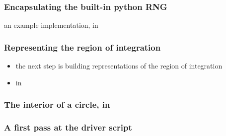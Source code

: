 %
%


\begin{frame}[fragile]
%
  \frametitle{Encapsulating the built-in python RNG}
%
  an example implementation, in 
%
%
\end{frame}

\begin{frame}[fragile]
%
  \frametitle{Representing the region of integration}
%
  \begin{itemize}
  \item the next step is building representations of the region of integration
  \item in 
  \end{itemize}
%
%
\end{frame}

\begin{frame}[fragile]
%
  \frametitle{The interior of a circle, in }
%
%
\end{frame}

\begin{frame}[fragile]
%
  \frametitle{A first pass at the driver script}
%
%
\end{frame}

